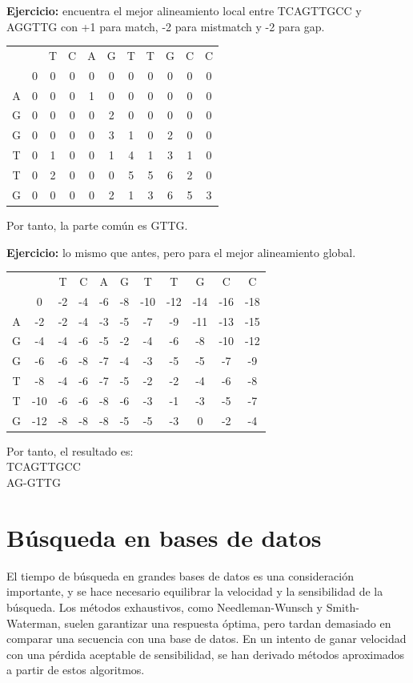 \begin{table}[h]
\begin{mdframed}[backgroundcolor=black!10]
\textbf{Ejercicio:} encuentra el mejor alineamiento local entre TCAGTTGCC y AGGTTG con +1 para match, -2 para mistmatch y -2 para gap.

\begin{tabular}{c c c c c c c c c c c}
&&T&C&A&G&T&T&G&C&C\\
&0&0&0&0&0&0&0&0&0&0\\
A &0 &0&0&1&0&0&0&0&0&0\\
G &0 &0&0&0&2&0&0&0&0&0\\ 
G &0 &0&0&0&3&1&0&2&0&0\\ 
T &0 &1&0&0&1&4&1&3&1&0\\ 
T &0 &2&0&0&0&5&5&6&2&0\\ 
G &0 &0&0&0&2&1&3&6&5&3\\ 
\end{tabular}

Por tanto, la parte común es GTTG.

\textbf{Ejercicio:} lo mismo que antes, pero para el mejor alineamiento global.
\begin{tabular}{c c c c c c c c c c c}
&&T&C&A&G&T&T&G&C&C\\
&0&-2&-4&-6&-8&-10&-12&-14&-16&-18\\
A &-2 &-2&-4&-3&-5&-7&-9&-11&-13&-15\\
G &-4 &-4&-6&-5&-2&-4&-6&-8&-10&-12\\ 
G &-6 &-6&-8&-7&-4&-3&-5&-5&-7&-9\\ 
T &-8 &-4&-6&-7&-5&-2&-2&-4&-6&-8\\ 
T &-10 &-6&-6&-8&-6&-3&-1&-3&-5&-7\\ 
G &-12&-8&-8&-8&-5&-5&-3&0&-2&-4\\ 
\end{tabular}
Por tanto, el resultado es:\\
TCAGTTGCC\\
AG-GTTG
\end{mdframed}
\end{table}

\section{Búsqueda en bases de datos}
El tiempo de búsqueda en grandes bases de datos es una consideración importante, y se hace necesario equilibrar la velocidad y la sensibilidad de la búsqueda. Los métodos exhaustivos, como Needleman-Wunsch y Smith-Waterman, suelen garantizar una respuesta óptima, pero tardan demasiado en comparar una secuencia con una base de datos. En un intento de ganar velocidad con una pérdida aceptable de sensibilidad, se han derivado métodos aproximados a partir de estos algoritmos.

